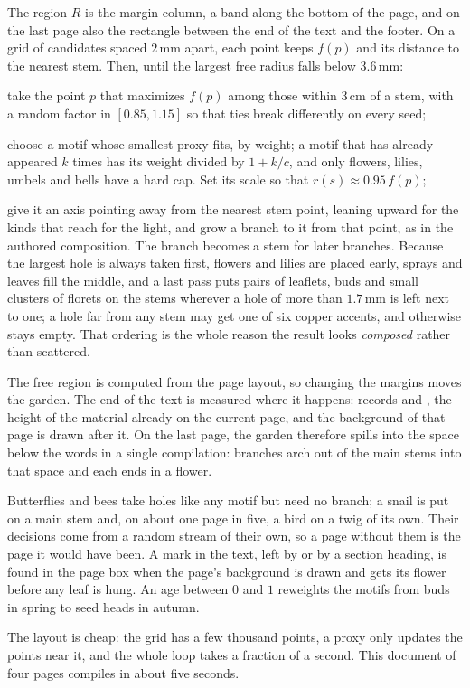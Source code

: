 \startconstruction[title={Growth}]
The region $R$ is the margin column, a band along the bottom of the page, and on the last
page also the rectangle between the end of the text and the footer. On a grid of candidates
spaced $2$\,mm apart, each point keeps $f(p)$ and its distance to the nearest stem. Then,
until the largest free radius falls below $3.6$\,mm:
\startitemize[n,packed]
  \item take the point $p$ that maximizes $f(p)$ among those within $3$\,cm of a stem, with
        a random factor in $[0.85,1.15]$ so that ties break differently on every seed;
  \item choose a motif whose smallest proxy fits, by weight; a motif that has already
        appeared $k$ times has its weight divided by $1+k/c$, and only flowers, lilies,
        umbels and bells have a hard cap. Set its scale so that $r(s)\approx0.95\,f(p)$;
  \item give it an axis pointing away from the nearest stem point, leaning upward for the
        kinds that reach for the light, and grow a branch to it from that point, as in the
        authored composition. The branch becomes a stem for later branches.
\stopitemize
Because the largest hole is always taken first, flowers and lilies are placed early,
sprays and leaves fill the middle, and a last pass puts pairs of leaflets, buds and small
clusters of florets on the stems wherever a hole of more than $1.7$\,mm is left next to
one; a hole far from any stem may get one of six copper accents, and otherwise stays empty.
That ordering is the whole reason the result looks \emph{composed} rather than scattered.
\stopconstruction

\startremark[title={Adapting to the text}]
The free region is computed from the page layout, so changing the margins moves the
garden. The end of the text is measured where it happens: \type{\florilegiumtextend}
records \type{\pagetotal} and \type{\pagedepth}, the height of the material already on the
current page, and the background of that page is drawn after it. On the last page, the
garden therefore spills into the space below the words in a single compilation: branches
arch out of the main stems into that space and each ends in a flower.
\stopremark

\startremark[title={Visitors, marks and seasons}]
Butterflies and bees take holes like any motif but need no branch; a snail is put on a
main stem and, on about one page in five, a bird on a twig of its own. Their decisions come
from a random stream of their own, so a page without them is the page it would have been.
A mark in the text, left by \type{\florilegiumbloom} or by a section heading, is found in
the page box when the page's background is drawn and gets its flower before any leaf is
hung. An age between $0$ and $1$ reweights the motifs from buds in spring to seed heads in
autumn.
\stopremark

\startremark[title={Cost}]
The layout is cheap: the grid has a few thousand points, a proxy only updates the points
near it, and the whole loop takes a fraction of a second. This document of four pages
compiles in about five seconds.
\stopremark

